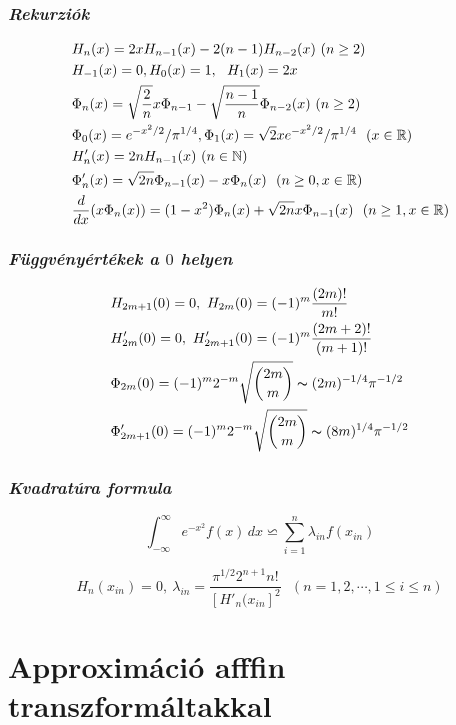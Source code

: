 \documentclass[oneside,titlepage,12pt,a4paper]{report}
\begin{document}
\subsubsection{\it  Rekurzi\'ok}
\begin{equation}
\begin{split}
&H_n(x)=2xH_{n-1}(x)-2(n-1)H_{n-2}(x)\ (n\ge 2)\\
&H_{-1}(x)=0,  H_0(x)=1,\ \ H_1(x)=2x\\
&\Phi_n(x)=\sqrt{\frac 2 n}x\Phi_{n-1}-\sqrt{\frac {n-1} n}\Phi_{n-2}(x)\ (n\ge 2)\\ &\Phi_0(x)=e^{-x^2/2}/\pi^{1/4}, \Phi_1(x)= \sqrt 2 x e^{-x^2/2}/\pi^{1/4}\ \ (x\in\Bbb R)\\
&H'_n(x)=2nH_{n-1}(x)\ (n\in\Bbb N)\\
&\Phi'_n(x)=\sqrt{2n}\Phi_{n-1}(x)-x\Phi_n(x)\ \ (n\ge 0, x\in\Bbb R)\\
&\frac d{dx}(x\Phi_n(x))=(1-x^2)\Phi_n(x)+\sqrt{2n}x\Phi_{n-1}(x)\ \ (n\ge 1, x\in\Bbb R)
\label{eq:identities}
\end{split}
\end{equation}

\subsubsection{\it  F\"uggv\'eny\'ert\'ekek a $0$ helyen}
\begin{equation}
\begin{split}
&H_{2m+1}(0)=0,\ H_{2m}(0)=(-1)^m\frac{(2m)!}{m!}\\
&H'_{2m}(0)=0,\ H'_{2m+1}(0)=(-1)^m\frac{(2m+2)!}{(m+1)!}\\
&\Phi_{2m}(0)=(-1)^m2^{-m}\sqrt{\binom {2m}m}\thicksim (2 m)^{-1/4}\pi^{-1/2}\\
&\Phi'_{2m+1}(0)=(-1)^m2^{-m}\sqrt{\binom {2m}m}\thicksim (8m)^{1/4}\pi^{-1/2}
\end{split}
\end{equation}

\subsubsection{\it Kvadrat\'ura formula}
$$
\int_{-\infty}^\infty e^{-x^2}f(x)\, dx\backsimeq \sum_{i=1}^n \lambda_{in}f(x_{in})
$$

$$
H_n(x_{in})=0,\ \lambda_{in}=\frac{\pi^{1/2}2^{n+1}n!}{[H'_n(x_{in}]^2}\ \ \  (n=1,2,\cdots, 1\le i\le n)
$$

\section{Approxim\'aci\'o afffin transzform\'altakkal}
\label{app:aprx}
\end{document}
